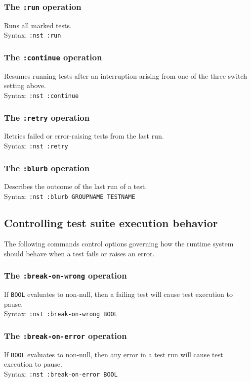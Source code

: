 \documentclass{article}
\begin{document}
\subsubsection{The \texttt{:run} operation}
%
Runs all marked tests.
\\ Syntax: \texttt{:nst :run}

\subsubsection{The \texttt{:continue} operation}
%
Resumes running tests after an interruption arising from one of the
three switch setting above.
\\ Syntax: \texttt{:nst :continue}

\subsubsection{The \texttt{:retry} operation}
%
Retries failed or error-raising tests from the last run.
\\ Syntax: \texttt{:nst :retry}

\subsubsection{The \texttt{:blurb} operation}
%
Describes the outcome of the last run of a test.
\\ Syntax: \texttt{:nst :blurb GROUPNAME TESTNAME}

\subsection{Controlling test suite execution behavior}
The following commands control options governing how the runtime
system should behave when a test fails or raises an error.

\subsubsection{The \texttt{:break-on-wrong} operation}
%
If \texttt{BOOL} evaluates to non-null, then a failing test will cause
test execution to pause.
\\ Syntax: \texttt{:nst :break-on-wrong BOOL}

\subsubsection{The \texttt{:break-on-error} operation}
%
If \texttt{BOOL} evaluates to non-null, then any error in a test run
will cause test execution to pause.
\\ Syntax: \texttt{:nst :break-on-error BOOL}
\end{document}
